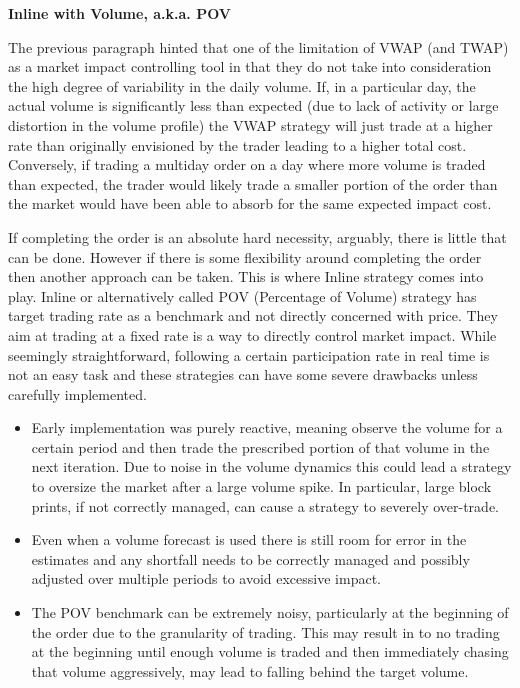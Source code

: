 \noindent\textbf{Inline with Volume, a.k.a. POV} \label{in:pov2} \twomedskip


The previous paragraph hinted that one of the limitation of VWAP (and TWAP) as a market impact controlling tool in that they do not take into consideration the high degree of variability in the daily volume. If, in a particular day, the actual volume is significantly less than expected (due to lack of activity or large distortion in the volume profile) the VWAP strategy will just trade at a higher rate than originally envisioned by the trader leading to a higher total cost. Conversely, if trading a multiday order on a day where more volume is traded than expected, the trader would likely trade a smaller portion of the order than the market would have been able to absorb for the same expected impact cost.


If completing the order is an absolute hard necessity, arguably, there is little that can be done. However if there is some flexibility around completing the order then another approach can be taken. This is where Inline strategy comes into play. Inline or alternatively called POV (Percentage of Volume) strategy has target trading rate as a benchmark and not directly concerned with price. They aim at trading at a fixed rate is a way to directly control market impact. While seemingly straightforward, following a certain participation rate in real time is not an easy task and these strategies can have some severe drawbacks unless carefully implemented.


\begin{itemize}
\item Early implementation was purely reactive, meaning observe the volume for a certain period and then trade the prescribed portion of that volume in the next iteration. Due to noise in the volume dynamics this could lead a strategy to oversize the market after a large volume spike. In particular, large block prints, if not correctly managed, can cause a strategy to severely over-trade.

\item Even when a volume forecast is used there is still room for error in the estimates and any shortfall needs to be correctly managed and possibly adjusted over multiple periods to avoid excessive impact.

\item The POV benchmark can be extremely noisy, particularly at the beginning of the order due to the granularity of trading. This may result in to no trading at the beginning until enough volume is traded and then immediately chasing that volume aggressively, may lead to falling behind the target volume.
\end{itemize}


